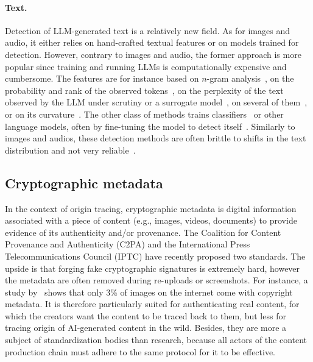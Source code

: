 \paragraph{Text.}
Detection of LLM-generated text is a relatively new field.
As for images and audio, it either relies on hand-crafted textual features or on models trained for detection.
However, contrary to images and audio, the former approach is more popular since training and running LLMs is computationally expensive and cumbersome.
The features are for instance based on $n$-gram analysis~\citep{yang2023dna}, on the probability and rank of the observed tokens~\citep{gehrmann2019gltr, ippolito2019automatic}, on the perplexity of the text observed by the LLM under scrutiny or a surrogate model~\citep{vasilatos2023howkgpt, wang2023m4}, on several of them~\citep{hans2024spotting}, or on its curvature~\citep{mitchell2023detectgpt}.
The other class of methods trains classifiers~\citep{bhattacharjee2024eagle} or other language models, often by fine-tuning the model to detect itself~\citep{solaiman2019release, zellers2019defending}.
Similarly to images and audios, these detection methods are often brittle to shifts in the text distribution and not very reliable~\citep{sadasivan2023can}.



\subsection{Cryptographic metadata}

In the context of origin tracing, cryptographic metadata is digital information associated with a piece of content (e.g., images, videos, documents) to provide evidence of its authenticity and/or provenance.
The Coalition for Content Provenance and Authenticity (\Gls*{C2PA}) and the International Press Telecommunications Council (IPTC) have recently proposed two standards.
The upside is that forging fake cryptographic signatures is extremely hard, however the metadata are often removed during re-uploads or screenshots. 
For instance, a study by~\citet{ImatagStudy} shows that only 3\% of images on the internet come with copyright metadata.
It is therefore particularly suited for authenticating real content, for which the creators want the content to be traced back to them, but less for tracing origin of AI-generated content in the wild.
Besides, they are more a subject of standardization bodies than research, because all actors of the content production chain must adhere to the same protocol for it to be effective.

